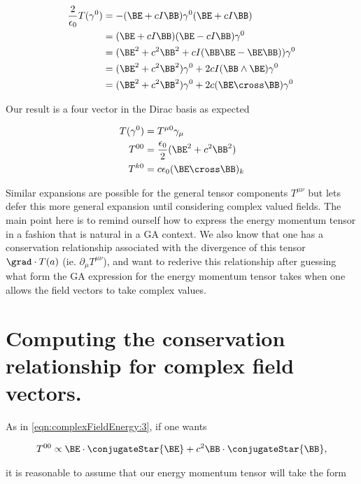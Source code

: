 \begin{align*}
\frac{2}{\epsilon_0} T(\gamma^0) 
&= -(\BE + c I \BB) \gamma^0 (\BE + c I \BB) \\
&= (\BE + c I \BB) (\BE - c I \BB) \gamma^0 \\
&= (\BE^2 + c^2 \BB^2 + c I (\BB \BE - \BE \BB)) \gamma^0 \\
&= (\BE^2 + c^2 \BB^2) \gamma^0 + 2 c I ( \BB \wedge \BE ) \gamma^0 \\
&= (\BE^2 + c^2 \BB^2) \gamma^0 + 2 c ( \BE \cross \BB ) \gamma^0 \\
\end{align*}

Our result is a four vector in the Dirac basis as expected

\begin{subequations}
\label{eqn:complexFieldEnergy:7}
\begin{align}
T(\gamma^0) &= T^{\mu 0} \gamma_\mu \\
T^{0 0} &= \frac{\epsilon_0}{2} (\BE^2 + c^2 \BB^2) \\
T^{k 0} &= c \epsilon_0 (\BE \cross \BB)_k 
\end{align}
\end{subequations}

Similar expansions are possible for the general tensor components $T^{\mu\nu}$ but lets defer this more general expansion until considering complex valued fields.  The main point here is to remind ourself how to express the energy momentum tensor in a fashion that is natural in a GA context.  We also know that one has a conservation relationship associated with the divergence of this tensor $\grad \cdot T(a)$ (ie. $\partial_\mu T^{\mu\nu}$), and want to rederive this relationship after guessing what form the GA expression for the energy momentum tensor takes when one allows the field vectors to take complex values.

\section{Computing the conservation relationship for complex field vectors.}

As in \ref{eqn:complexFieldEnergy:3}, if one wants

\begin{align}\label{eqn:complexFieldEnergy:8}
T^{0 0} \propto \BE \cdot \conjugateStar{\BE} + c^2 \BB \cdot \conjugateStar{\BB},
\end{align}

it is reasonable to assume that our energy momentum tensor will take the form

